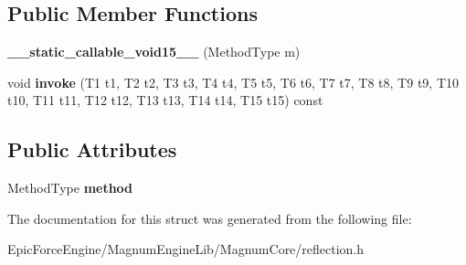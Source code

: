 \subsection*{Public Member Functions}
\begin{DoxyCompactItemize}
\item 
{\bfseries \+\_\+\+\_\+static\+\_\+callable\+\_\+void15\+\_\+\+\_\+} (Method\+Type m)\hypertarget{structagm_1_1reflection_1_1____static__callable__void15_____adfac1252f1763ca499927b2c5101591c}{}\label{structagm_1_1reflection_1_1____static__callable__void15_____adfac1252f1763ca499927b2c5101591c}

\item 
void {\bfseries invoke} (T1 t1, T2 t2, T3 t3, T4 t4, T5 t5, T6 t6, T7 t7, T8 t8, T9 t9, T10 t10, T11 t11, T12 t12, T13 t13, T14 t14, T15 t15) const \hypertarget{structagm_1_1reflection_1_1____static__callable__void15_____a92ddc48c21b596d79c2c5f4710684791}{}\label{structagm_1_1reflection_1_1____static__callable__void15_____a92ddc48c21b596d79c2c5f4710684791}

\end{DoxyCompactItemize}
\subsection*{Public Attributes}
\begin{DoxyCompactItemize}
\item 
Method\+Type {\bfseries method}\hypertarget{structagm_1_1reflection_1_1____static__callable__void15_____a7059d326c2697fde9b216e3324c01c5d}{}\label{structagm_1_1reflection_1_1____static__callable__void15_____a7059d326c2697fde9b216e3324c01c5d}

\end{DoxyCompactItemize}


The documentation for this struct was generated from the following file\+:\begin{DoxyCompactItemize}
\item 
Epic\+Force\+Engine/\+Magnum\+Engine\+Lib/\+Magnum\+Core/reflection.\+h\end{DoxyCompactItemize}
